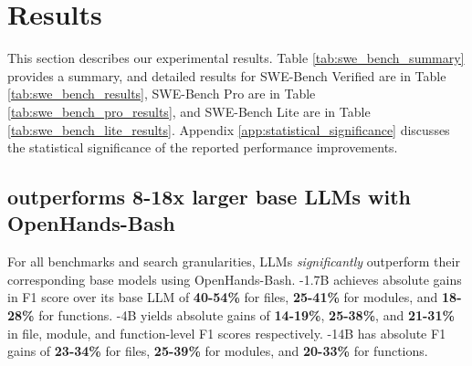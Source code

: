

\section{Results}\label{sec:results}

This section describes our experimental results. Table \ref{tab:swe_bench_summary} provides a summary, and detailed results for SWE-Bench Verified are in Table \ref{tab:swe_bench_results}, SWE-Bench Pro are in Table \ref{tab:swe_bench_pro_results}, and SWE-Bench Lite are in Table \ref{tab:swe_bench_lite_results}. Appendix \ref{app:statistical_significance} discusses the statistical significance of the reported performance improvements. 
\subsection{\methodname outperforms \textbf{8-18x} larger base LLMs with OpenHands-Bash}\label{sec:oh_bash_base}
For all benchmarks and search granularities, \methodname LLMs \emph{significantly} outperform their corresponding base models using OpenHands-Bash. \methodname-1.7B achieves absolute gains in F1 score over its base LLM of \textbf{40-54\%} for files, \textbf{25-41\%} for modules, and \textbf{18-28\%} for functions. \methodname-4B yields absolute gains of \textbf{14-19\%}, \textbf{25-38\%}, and \textbf{21-31\%} in file, module, and function-level F1 scores respectively. \methodname-14B has absolute F1 gains of \textbf{23-34\%} for files, \textbf{25-39\%} for modules, and \textbf{20-33\%} for functions.

